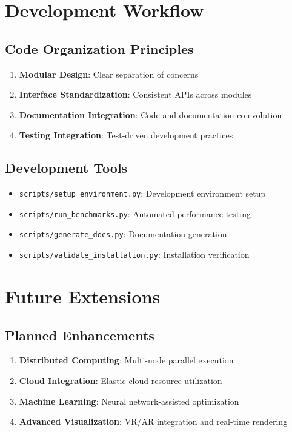 \documentclass{article}
\begin{document}
\section{Development Workflow}

\subsection{Code Organization Principles}

\begin{enumerate}
\item \textbf{Modular Design}: Clear separation of concerns
\item \textbf{Interface Standardization}: Consistent APIs across modules
\item \textbf{Documentation Integration}: Code and documentation co-evolution
\item \textbf{Testing Integration}: Test-driven development practices
\end{enumerate}

\subsection{Development Tools}

\begin{itemize}
\item \texttt{scripts/setup\_environment.py}: Development environment setup
\item \texttt{scripts/run\_benchmarks.py}: Automated performance testing
\item \texttt{scripts/generate\_docs.py}: Documentation generation
\item \texttt{scripts/validate\_installation.py}: Installation verification
\end{itemize}

\section{Future Extensions}

\subsection{Planned Enhancements}

\begin{enumerate}
\item \textbf{Distributed Computing}: Multi-node parallel execution
\item \textbf{Cloud Integration}: Elastic cloud resource utilization
\item \textbf{Machine Learning}: Neural network-assisted optimization
\item \textbf{Advanced Visualization}: VR/AR integration and real-time rendering
\end{enumerate}
\end{document}
